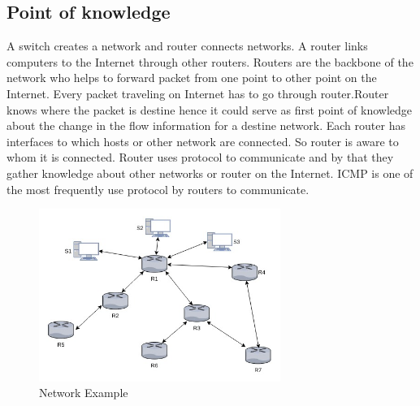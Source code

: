 \documentclass[10pt,oneside,a4paper]{article}
\begin{document}
\subsection{Point of knowledge}
A switch creates a network and router connects networks. A router links computers to the Internet through other routers. Routers are the backbone of the network who helps to forward packet from one point to other point on the Internet. Every packet traveling on Internet has to go through router\cite{router-switch}.Router knows where the packet is destine hence it could serve as first point of knowledge about the change in the flow information for a destine network. Each router has interfaces to which hosts or other network are connected. So router is aware to whom it is connected. Router uses protocol to communicate and by that they gather knowledge about other networks or router on the Internet. ICMP\cite{icmp} is one of the most frequently use protocol by routers to communicate.\par

\begin{figure}[H]
\centering
\includegraphics[width=0.70\textwidth]{routers.jpg}
\caption{Network Example} \label{fig:routers}
\end{figure}
\end{document}
